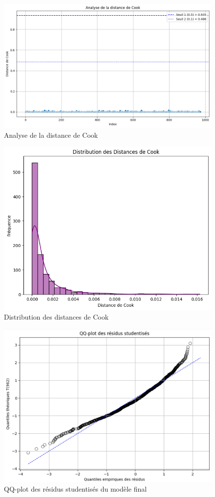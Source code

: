 \documentclass[12pt,a4paper]{article}
\begin{document}
\begin{figure}[H]
  \centering
  \includegraphics[width=0.7\linewidth]{cook.png}
  \caption{Analyse de la distance de Cook}
\end{figure}

\begin{figure}[H]
  \centering
  \includegraphics[width=0.7\linewidth]{cooks_d.png}
  \caption{Distribution des distances de Cook}
\end{figure}

\begin{figure}[H]
  \centering
  \includegraphics[width=0.7\linewidth]{qqplot.png}
  \caption{QQ-plot des résidus studentisés du modèle final}
\end{figure}
\end{document}
